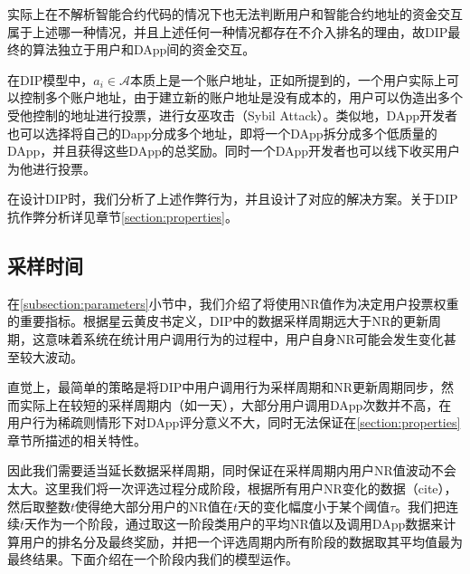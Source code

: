 实际上在不解析智能合约代码的情况下也无法判断用户和智能合约地址的资金交互属于上述哪一种情况，并且上述任何一种情况都存在不介入排名的理由，故DIP最终的算法独立于用户和DApp间的资金交互。

在DIP模型中，$a_i \in \mathcal{A}$本质上是一个账户地址，正如\cite{Nabulasyellowpaper}所提到的，一个用户实际上可以控制多个账户地址，由于建立新的账户地址是没有成本的，用户可以伪造出多个受他控制的地址进行投票，进行女巫攻击（Sybil Attack）。类似地，DApp开发者也可以选择将自己的Dapp分成多个地址，即将一个DApp拆分成多个低质量的DApp，并且获得这些DApp的总奖励。同时一个DApp开发者也可以线下收买用户为他进行投票。

在设计DIP时，我们分析了上述作弊行为，并且设计了对应的解决方案。关于DIP抗作弊分析详见章节\ref{section:properties}。



\subsection{采样时间}
在\ref{subsection:parameters}小节中，我们介绍了将使用NR值作为决定用户投票权重的重要指标。根据星云黄皮书定义\cite{Nabulasyellowpaper}，DIP中的数据采样周期远大于NR的更新周期，这意味着系统在统计用户调用行为的过程中，用户自身NR可能会发生变化甚至较大波动。

直觉上，最简单的策略是将DIP中用户调用行为采样周期和NR更新周期同步，然而实际上在较短的采样周期内（如一天），大部分用户调用DApp次数并不高，在用户行为稀疏则情形下对DApp评分意义不大，同时无法保证在\ref{section:properties}章节所描述的相关特性。

因此我们需要适当延长数据采样周期，同时保证在采样周期内用户NR值波动不会太大。这里我们将一次评选过程分成阶段，根据所有用户NR变化的数据（cite），然后取整数$t$使得绝大部分用户的NR值在$t$天的变化幅度小于某个阈值$\tau$。我们把连续$t$天作为一个阶段，通过取这一阶段类用户的平均NR值以及调用DApp数据来计算用户的排名分及最终奖励，并把一个评选周期内所有阶段的数据取其平均值最为最终结果。下面介绍在一个阶段内我们的模型运作。


